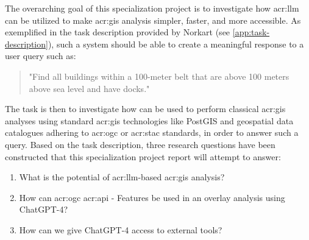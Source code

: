 The overarching goal of this specialization project is to investigate how \acrlong{acr:llm} can be utilized to make \gls{acr:gis} analysis simpler, faster, and more accessible. As exemplified in the task description provided by Norkart (see \cref{app:task-description}), such a system should be able to create a meaningful response to a user query such as:

\begin{quote}
    "Find all buildings within a 100-meter belt that are above 100 meters above sea level and have docks."
\end{quote}

The task is then to investigate how  can be used to perform classical \acrshort{acr:gis} analyses using standard \acrshort{acr:gis} technologies like PostGIS and geospatial data catalogues adhering to \acrshort{acr:ogc} or \acrshort{acr:stac} standards, in order to answer such a query. Based on the task description, three research questions have been constructed that this specialization project report will attempt to answer:

\begin{enumerate}
    \item What is the potential of \acrshort{acr:llm}-based \acrshort{acr:gis} analysis? \label{rq:llm-potential}
    \item How can \acrshort{acr:ogc} \acrshort{acr:api} - Features be used in an overlay analysis using ChatGPT-4? \label{rq:overlay-analysis}
    \item How can we give ChatGPT-4 access to external tools? \label{rq:external-tools}
\end{enumerate}

